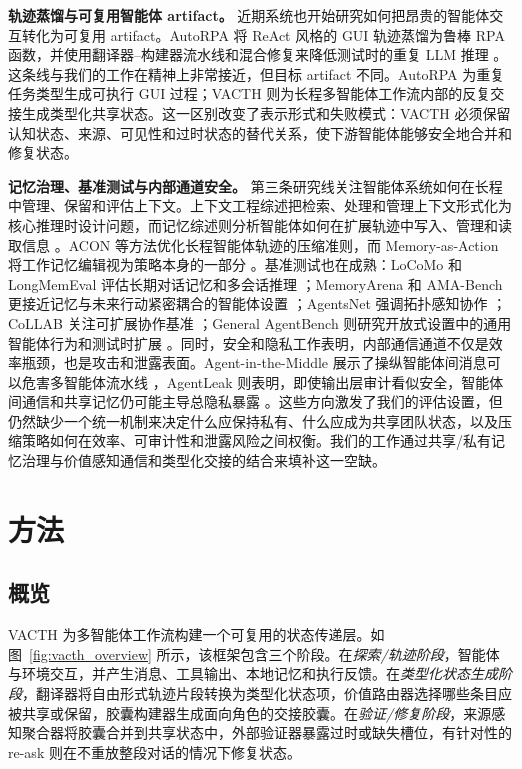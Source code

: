 \documentclass{article} %
\begin{document}
\textbf{轨迹蒸馏与可复用智能体 artifact。}
近期系统也开始研究如何把昂贵的智能体交互转化为可复用 artifact。AutoRPA 将 ReAct 风格的 GUI 轨迹蒸馏为鲁棒 RPA 函数，并使用翻译器--构建器流水线和混合修复来降低测试时的重复 LLM 推理 \cite{chen2026autorpa}。这条线与我们的工作在精神上非常接近，但目标 artifact 不同。AutoRPA 为重复任务类型生成可执行 GUI 过程；VACTH 则为长程多智能体工作流内部的反复交接生成类型化共享状态。这一区别改变了表示形式和失败模式：VACTH 必须保留认知状态、来源、可见性和过时状态的替代关系，使下游智能体能够安全地合并和修复状态。

\textbf{记忆治理、基准测试与内部通道安全。}
第三条研究线关注智能体系统如何在长程中管理、保留和评估上下文。上下文工程综述把检索、处理和管理上下文形式化为核心推理时设计问题，而记忆综述则分析智能体如何在扩展轨迹中写入、管理和读取信息 \cite{mei2025contextengineering,zhang2024memorymechanism,du2026memoryautonomous}。ACON 等方法优化长程智能体轨迹的压缩准则，而 Memory-as-Action 将工作记忆编辑视为策略本身的一部分 \cite{kang2025acon,zhang2025memoryasaction}。基准测试也在成熟：LoCoMo 和 LongMemEval 评估长期对话记忆和多会话推理 \cite{maharana2024locomo,wu2025longmemeval}；MemoryArena 和 AMA-Bench 更接近记忆与未来行动紧密耦合的智能体设置 \cite{he2026memoryarena,zhao2026amabench}；AgentsNet 强调拓扑感知协作 \cite{groetschla2026agentsnet}；CoLLAB 关注可扩展协作基准 \cite{mahmud2025collab}；General AgentBench 则研究开放式设置中的通用智能体行为和测试时扩展 \cite{li2026generalagentbench}。同时，安全和隐私工作表明，内部通信通道不仅是效率瓶颈，也是攻击和泄露表面。Agent-in-the-Middle 展示了操纵智能体间消息可以危害多智能体流水线 \cite{he2025aitm}，AgentLeak 则表明，即使输出层审计看似安全，智能体间通信和共享记忆仍可能主导总隐私暴露 \cite{elyagoubi2026agentleak}。这些方向激发了我们的评估设置，但仍然缺少一个统一机制来决定什么应保持私有、什么应成为共享团队状态，以及压缩策略如何在效率、可审计性和泄露风险之间权衡。我们的工作通过共享/私有记忆治理与价值感知通信和类型化交接的结合来填补这一空缺。

\section{方法}
\label{sec:method}

\subsection{概览}

VACTH 为多智能体工作流构建一个可复用的状态传递层。如图~\ref{fig:vacth_overview} 所示，该框架包含三个阶段。在\emph{探索/轨迹阶段}，智能体与环境交互，并产生消息、工具输出、本地记忆和执行反馈。在\emph{类型化状态生成阶段}，翻译器将自由形式轨迹片段转换为类型化状态项，价值路由器选择哪些条目应被共享或保留，胶囊构建器生成面向角色的交接胶囊。在\emph{验证/修复阶段}，来源感知聚合器将胶囊合并到共享状态中，外部验证器暴露过时或缺失槽位，有针对性的 re-ask 则在不重放整段对话的情况下修复状态。
\end{document}
